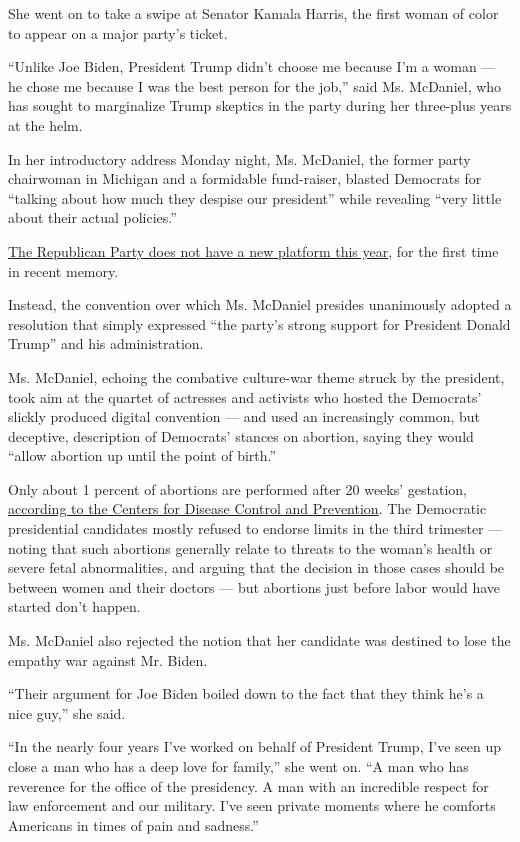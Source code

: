 She went on to take a swipe at Senator Kamala Harris, the first woman of
color to appear on a major party's ticket.

``Unlike Joe Biden, President Trump didn't choose me because I'm a woman
--- he chose me because I was the best person for the job,'' said Ms.
McDaniel, who has sought to marginalize Trump skeptics in the party
during her three-plus years at the helm.

In her introductory address Monday night, Ms. McDaniel, the former party
chairwoman in Michigan and a formidable fund-raiser, blasted Democrats
for ``talking about how much they despise our president'' while
revealing ``very little about their actual policies.''

\href{https://prod-cdn-static.gop.com/docs/Resolution_Platform_2020.pdf?_ga=2.165306300.2055661719.1598124638-455285808.1584478680}{The
Republican Party does not have a new platform this year}, for the first
time in recent memory.

Instead, the convention over which Ms. McDaniel presides unanimously
adopted a resolution that simply expressed ``the party's strong support
for President Donald Trump'' and his administration.

Ms. McDaniel, echoing the combative culture-war theme struck by the
president, took aim at the quartet of actresses and activists who hosted
the Democrats' slickly produced digital convention --- and used an
increasingly common, but deceptive, description of Democrats' stances on
abortion, saying they would ``allow abortion up until the point of
birth.''

Only about 1 percent of abortions are performed after 20 weeks'
gestation,
\href{https://www.cdc.gov/reproductivehealth/data_stats/abortion.htm}{according
to the Centers for Disease Control and Prevention}. The Democratic
presidential candidates mostly refused to endorse limits in the third
trimester --- noting that such abortions generally relate to threats to
the woman's health or severe fetal abnormalities, and arguing that the
decision in those cases should be between women and their doctors ---
but abortions just before labor would have started don't happen.

Ms. McDaniel also rejected the notion that her candidate was destined to
lose the empathy war against Mr. Biden.

``Their argument for Joe Biden boiled down to the fact that they think
he's a nice guy,'' she said.

``In the nearly four years I've worked on behalf of President Trump,
I've seen up close a man who has a deep love for family,'' she went on.
``A man who has reverence for the office of the presidency. A man with
an incredible respect for law enforcement and our military. I've seen
private moments where he comforts Americans in times of pain and
sadness.''


